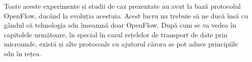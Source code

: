 Toate aceste experimente și studii de caz prezentate au avut la bază protocolul OpenFlow, ducând la evoluția acestuia. Acest lucru nu trebuie să ne ducă însă cu gândul că tehnologia \gls{sdn} înseamnă doar OpenFlow. După cum se va vedea în capitolele următoare, în special în cazul rețelelor de transport de date prin microunde, există și alte protocoale cu ajutorul cărora se pot aduce principiile \gls{sdn} în rețea.
